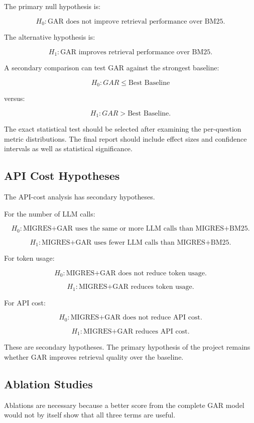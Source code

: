 \documentclass[11pt,a4paper]{article}
\begin{document}
The primary null hypothesis is:

\[
H_0:
\text{GAR does not improve retrieval performance over BM25.}
\]

The alternative hypothesis is:

\[
H_1:
\text{GAR improves retrieval performance over BM25.}
\]

A secondary comparison can test GAR against the strongest baseline:

\[
H_0:
GAR \leq \text{Best Baseline}
\]

versus:

\[
H_1:
GAR > \text{Best Baseline}.
\]

The exact statistical test should be selected after examining the per-question metric distributions. The final report should include effect sizes and confidence intervals as well as statistical significance.


\subsection{API Cost Hypotheses}

The API-cost analysis has secondary hypotheses.

For the number of LLM calls:

\[
H_0:
\text{MIGRES+GAR uses the same or more LLM calls than MIGRES+BM25.}
\]

\[
H_1:
\text{MIGRES+GAR uses fewer LLM calls than MIGRES+BM25.}
\]

For token usage:

\[
H_0:
\text{MIGRES+GAR does not reduce token usage.}
\]

\[
H_1:
\text{MIGRES+GAR reduces token usage.}
\]

For API cost:

\[
H_0:
\text{MIGRES+GAR does not reduce API cost.}
\]

\[
H_1:
\text{MIGRES+GAR reduces API cost.}
\]

These are secondary hypotheses. The primary hypothesis of the project remains whether GAR improves retrieval quality over the baseline.

\subsection{Ablation Studies}

Ablations are necessary because a better score from the complete GAR model would not by itself show that all three terms are useful.
\end{document}
